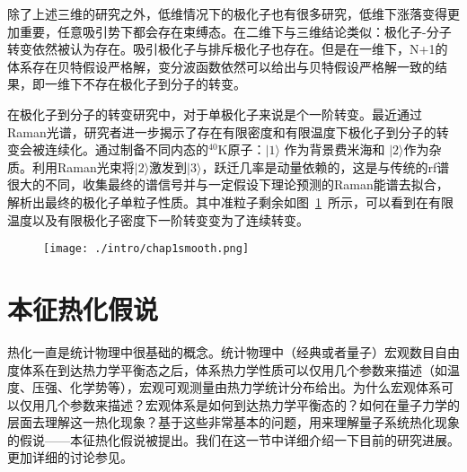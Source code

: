 除了上述三维的研究之外，低维情况下的极化子也有很多研究，低维下涨落变得更加重要，任意吸引势下都会存在束缚态。在二维下与三维结论类似：极化子-分子转变依然被认为存在\cite{Zollner2011Polarons,Parish2011pm,Lewenstein2013spinchain012High}。吸引极化子与排斥极化子也存在\cite{Schmidt2012fermi,Ngampruetikorn_2012}。但是在一维下，N+1的体系存在贝特假设严格解\cite{mcguire1965interacting,mcguire1966interacting}，变分波函数依然可以给出与贝特假设严格解一致的结果，即一维下不存在极化子到分子的转变\cite{Giraud2009highly,Leskinen_2010,Astrakharchik2013trapped}。

在极化子到分子的转变研究中，对于单极化子来说是个一阶转变。最近通过Raman光谱，研究者进一步揭示了存在有限密度和有限温度下极化子到分子的转变会被连续化。通过制备不同内态的${}^{40}$K原子：$|1\rangle$ 作为背景费米海和 $|2\rangle$作为杂质。利用Raman光束将$|2\rangle$激发到$|3\rangle$，跃迁几率是动量依赖的，这是与传统的rf谱很大的不同，收集最终的谱信号并与一定假设下理论预测的Raman能谱去拟合，解析出最终的极化子单粒子性质。其中准粒子剩余如图~\ref{fpsmooth}~所示，可以看到在有限温度以及有限极化子密度下一阶转变变为了连续转变。
\begin{figure}[!htbp]
    \centering
    \texttt{[image: ./intro/chap1smooth.png]}
    \label{fpsmooth}
\end{figure}




\section{本征热化假说}\label{sec:ETH}
热化一直是统计物理中很基础的概念。统计物理中（经典或者量子）宏观数目自由度体系在到达热力学平衡态之后，体系热力学性质可以仅用几个参数来描述（如温度、压强、化学势等），宏观可观测量由热力学统计分布给出。为什么宏观体系可以仅用几个参数来描述？宏观体系是如何到达热力学平衡态的？如何在量子力学的层面去理解这一热化现象？基于这些非常基本的问题，用来理解量子系统热化现象的假说——本征热化假说被提出。我们在这一节中详细介绍一下目前的研究进展。更加详细的讨论参见\cite{d2016quantum,deutsch2018eigenstate}。

